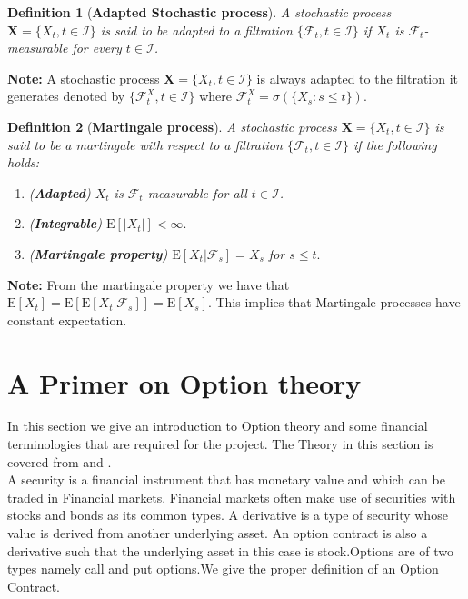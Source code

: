 \documentclass[12pt]{report}
\newtheorem{definition}{Definition}[section]
\newcommand{\E}{\mathrm{E}}
\begin{document}
\begin{definition}[\textbf{Adapted Stochastic process}]
A stochastic process $\mathbf{X} = \{X_t ,t \in \mathcal{I}\}$ is said to be adapted to a filtration $\{\mathcal{F}_t, t \in \mathcal{I}\}$ if $X_t$ is $\mathcal{F}_t$-measurable for every $t \in \mathcal{I}$.
\end{definition}
\textbf{Note:} A stochastic process $\mathbf{X} = \{X_t ,t \in \mathcal{I}\}$ is always adapted to the filtration it generates denoted by $\{\mathcal{F}^{X}_t, t \in \mathcal{I}\}$ where $\mathcal{F}^{X}_t = \sigma(\{X_s :s \leq t \}).$

\begin{definition}[\textbf{Martingale process}]
A stochastic process $\mathbf{X} = \{X_t ,t \in \mathcal{I}\}$ is said to be a martingale with respect to a filtration $\{\mathcal{F}_t, t \in \mathcal{I}\}$ if the following holds:
\begin{enumerate}
    \item (\textbf{Adapted}) $X_t$ is $\mathcal{F}_t$-measurable for all $t \in \mathcal{I} $.
    \item (\textbf{Integrable}) $\E[|X_t|] < \infty.$
    \item (\textbf{Martingale property}) $\E[X_t | \mathcal{F}_{s}] = X_s$ for $s \leq t.$
\end{enumerate}
\end{definition}
\textbf{Note:} From the martingale property we have that $\E[X_t] = \E[\E[X_t | \mathcal{F}_{s}]] = \E[X_s] $. This implies that Martingale processes have constant expectation.







\section{A Primer on Option theory}
In this section we give an introduction to Option theory and some financial terminologies that are required for the project. The Theory in this section is covered from \cite{campolieti_2014} and \cite{papanicolaou_2019}.\\
A security is a financial instrument that has monetary value and which can be traded in Financial markets. Financial markets often make use of securities with stocks and
bonds as its common types. A derivative is a type of security whose value is derived from another underlying asset. An option contract is also a derivative such that the underlying asset in this case is stock.Options are of two types namely call and put options.We give the proper definition of an Option Contract. 
\end{document}
